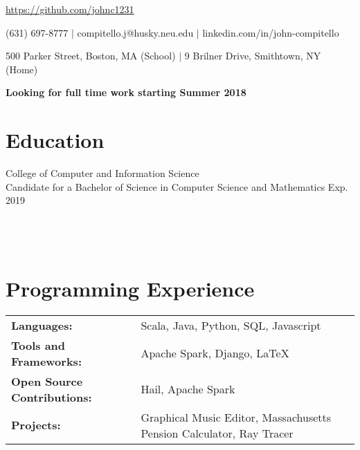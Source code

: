 \documentclass[12pt]{john_resume}
\begin{document}
\centerline{\url{https://github.com/johnc1231}}
\centerline{(631) 697-8777 $|$ compitello.j@husky.neu.edu $|$ linkedin.com/in/john-compitello}
\centerline{500 Parker Street, Boston, MA (School) $|$ 9 Brilner Drive, Smithtown, NY (Home)}
\centerline{\textbf{Looking for full time work starting Summer 2018}}

\section{Education}
College of Computer and Information Science\\
Candidate for a Bachelor of Science in Computer Science and Mathematics \hspace*{\fill} Exp. 2019 \\
 \\
\\
 \\

\section{Programming Experience}
\begin{tabular}{l l}
\textbf{Languages:} & Scala, Java, Python, SQL, Javascript\\
\textbf{Tools and Frameworks:} & Apache Spark, Django, LaTeX \\
\textbf{Open Source Contributions:} & Hail, Apache Spark \\
\textbf{Projects:} & Graphical Music Editor, Massachusetts Pension Calculator, Ray Tracer
\end{tabular}
\end{document}
